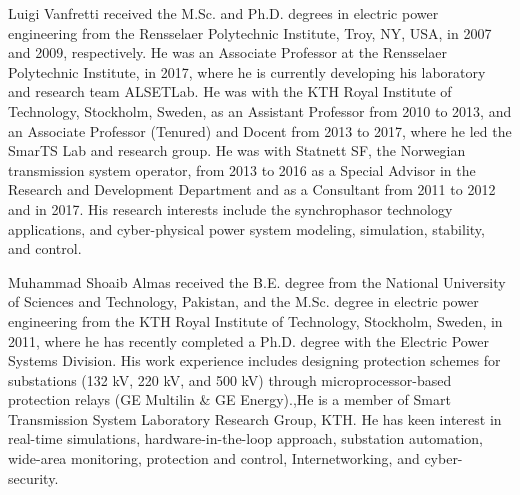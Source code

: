 \documentclass{ieeeaccess}
\begin{document}
\begin{IEEEbiography}{Luigi Vanfretti}
 received the M.Sc. and Ph.D. degrees in electric power engineering from the Rensselaer Polytechnic Institute, Troy, NY, USA, in 2007 and 2009, respectively. He was an Associate Professor at the Rensselaer Polytechnic Institute, in 2017, where he is currently developing his laboratory and research team ALSETLab. He was with the KTH Royal Institute of Technology, Stockholm, Sweden, as an Assistant Professor from 2010 to 2013, and an Associate Professor (Tenured) and Docent from 2013 to 2017, where he led the SmarTS Lab and research group. He was with Statnett SF, the Norwegian transmission system operator, from 2013 to 2016 as a Special Advisor in the Research and Development Department and as a Consultant from 2011 to 2012 and in 2017. His research interests include the synchrophasor technology applications, and cyber-physical power system modeling, simulation, stability, and control. 
\end{IEEEbiography}

\begin{IEEEbiography}{Muhammad Shoaib Almas}
received the B.E. degree from the National University of Sciences and Technology, Pakistan, and the M.Sc. degree in electric power engineering from the KTH Royal Institute of Technology, Stockholm, Sweden, in 2011, where he has recently completed a Ph.D. degree with the Electric Power Systems Division. His work experience includes designing protection schemes for substations (132 kV, 220 kV, and 500 kV) through microprocessor-based protection relays (GE Multilin \& GE Energy).,He is a member of Smart Transmission System Laboratory Research Group, KTH. He has keen interest in real-time simulations, hardware-in-the-loop approach, substation automation, wide-area monitoring, protection and control, Internetworking, and cyber-security. 
\end{IEEEbiography}

\EOD
\end{document}
